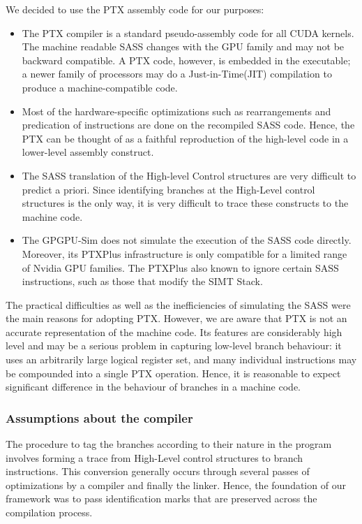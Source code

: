 	We decided to use the PTX assembly code for our purposes:
	\begin{itemize}
	\item The PTX compiler is a standard pseudo-assembly code for all CUDA kernels. The machine readable SASS changes with
	the GPU family and may not be backward compatible. A PTX code, however, is embedded in the executable; a newer
	family of processors may do a Just-in-Time(JIT) compilation to produce a machine-compatible code. 
	\item Most of the hardware-specific optimizations such as rearrangements and predication of instructions are done on the 
	recompiled SASS code. Hence, the PTX can be thought of as a faithful reproduction of the high-level code in a lower-level
	assembly construct.
	\item The SASS translation of the High-level Control structures are very difficult to predict a priori. Since identifying
	branches at the High-Level control structures is the only way, it is very difficult to trace these constructs to the
	 machine code.
	\item The GPGPU-Sim does not simulate the execution of the SASS code directly. Moreover, its PTXPlus infrastructure is only
	compatible for a limited range of Nvidia GPU families. The PTXPlus also known to ignore certain SASS instructions, such as
	those that modify the SIMT Stack. 
	\end{itemize}
		
	The practical difficulties as well as the inefficiencies of simulating the SASS were the main reasons for adopting PTX. However,
	we are aware that PTX is not an accurate representation of the machine code. Its features are considerably high level and may be a serious problem in capturing low-level branch behaviour: it uses an arbitrarily large logical register set, and many individual instructions may be compounded into a single PTX operation. Hence, it is reasonable to expect significant difference in the behaviour of branches in a machine code.

	\subsubsection*{Assumptions about the compiler}
	The procedure to tag the branches according to their nature in the program involves forming a trace from High-Level control
	structures to branch instructions. This conversion generally occurs through several passes of optimizations by a compiler 
	and finally the linker. Hence, the foundation of our framework was to pass identification marks that are preserved across
	the compilation process. 
	
